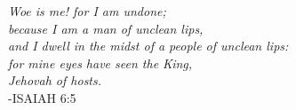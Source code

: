 \cleartorecto
\begin{vplace}
\begin{center}
\textit{
Woe is me! for I am undone; \\
because I am a man of unclean lips, \\
and I dwell in the midst of a people of unclean lips: \\
for mine eyes have seen the King, \\
Jehovah of hosts.} \\
-ISAIAH 6:5
\end{center}
\end{vplace}

\ClearShipoutPicture